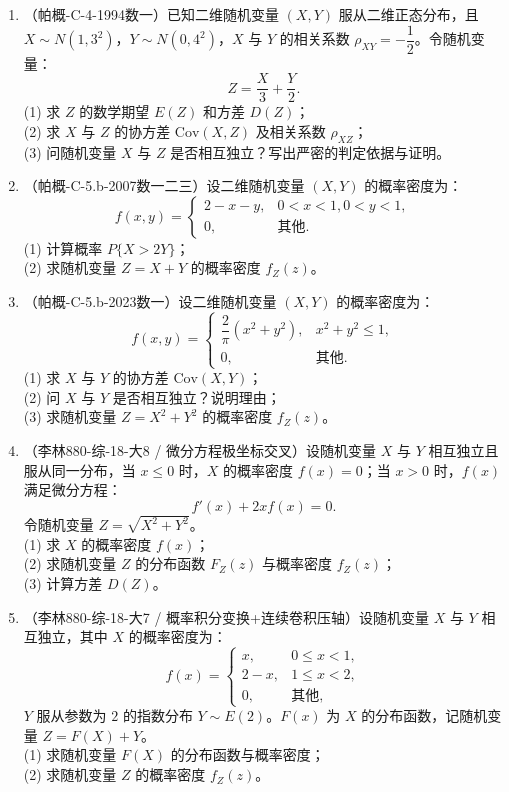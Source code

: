 \documentclass[12pt,a4paper]{ctexart}
\begin{document}
\begin{enumerate}[label=\arabic*.,resume]
\newpage
\item（帕概-C-4-1994数一）已知二维随机变量 $(X, Y)$ 服从二维正态分布，且 $X \sim N(1, 3^{2})$，$Y \sim N(0, 4^{2})$，$X$ 与 $Y$ 的相关系数 $\rho_{XY} = -\dfrac{1}{2}$。令随机变量：
\[
Z = \frac{X}{3} + \frac{Y}{2}.
\]
(1) 求 $Z$ 的数学期望 $E(Z)$ 和方差 $D(Z)$；\\
(2) 求 $X$ 与 $Z$ 的协方差 $\mathrm{Cov}(X, Z)$ 及相关系数 $\rho_{XZ}$；\\
(3) 问随机变量 $X$ 与 $Z$ 是否相互独立？写出严密的判定依据与证明。

\item（帕概-C-5.b-2007数一二三）设二维随机变量 $(X, Y)$ 的概率密度为：
\[
f(x, y) = \begin{cases} 2 - x - y, & 0 < x < 1, 0 < y < 1, \\ 0, & \text{其他}. \end{cases}
\]
(1) 计算概率 $P\{X > 2Y\}$；\\
(2) 求随机变量 $Z = X + Y$ 的概率密度 $f_{Z}(z)$。

\item（帕概-C-5.b-2023数一）设二维随机变量 $(X, Y)$ 的概率密度为：
\[
f(x, y) = \begin{cases} \dfrac{2}{\pi}(x^{2} + y^{2}), & x^{2} + y^{2} \leqslant 1, \\ 0, & \text{其他}. \end{cases}
\]
(1) 求 $X$ 与 $Y$ 的协方差 $\mathrm{Cov}(X, Y)$；\\
(2) 问 $X$ 与 $Y$ 是否相互独立？说明理由；\\
(3) 求随机变量 $Z = X^{2} + Y^{2}$ 的概率密度 $f_{Z}(z)$。

\item（李林880-综-18-大8 / 微分方程极坐标交叉）设随机变量 $X$ 与 $Y$ 相互独立且服从同一分布，当 $x \leqslant 0$ 时，$X$ 的概率密度 $f(x) = 0$；当 $x > 0$ 时，$f(x)$ 满足微分方程：
\[
f'(x) + 2x f(x) = 0.
\]
令随机变量 $Z = \sqrt{X^{2} + Y^{2}}$。\\
(1) 求 $X$ 的概率密度 $f(x)$；\\
(2) 求随机变量 $Z$ 的分布函数 $F_{Z}(z)$ 与概率密度 $f_{Z}(z)$；\\
(3) 计算方差 $D(Z)$。

\item（李林880-综-18-大7 / 概率积分变换+连续卷积压轴）设随机变量 $X$ 与 $Y$ 相互独立，其中 $X$ 的概率密度为：
\[
f(x) = \begin{cases} x, & 0 \leqslant x < 1, \\ 2 - x, & 1 \leqslant x < 2, \\ 0, & \text{其他}, \end{cases}
\]
$Y$ 服从参数为 $2$ 的指数分布 $Y \sim E(2)$。$F(x)$ 为 $X$ 的分布函数，记随机变量 $Z = F(X) + Y$。\\
(1) 求随机变量 $F(X)$ 的分布函数与概率密度；\\
(2) 求随机变量 $Z$ 的概率密度 $f_{Z}(z)$。

\end{enumerate}
\end{document}
